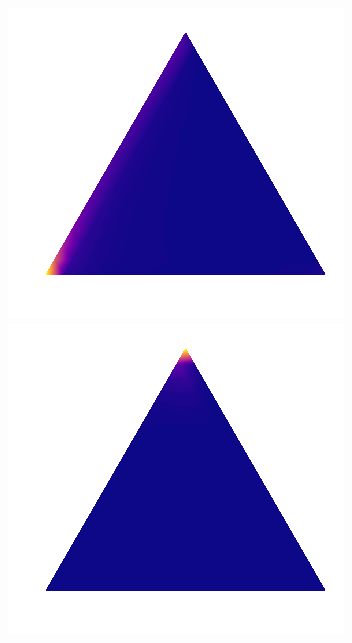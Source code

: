 \begin{figure}
 \begin{minipage}[]{.3\textwidth}
    \includegraphics[width=\textwidth]{plots/experiment_structures/triangle_1kld.png}
\subcaption{}
\end{minipage}
 \begin{minipage}{.3\textwidth}
    \includegraphics[width=\textwidth]{plots/experiment_structures/triangle_1elbo.png}

\end{minipage}
\end{figure}
